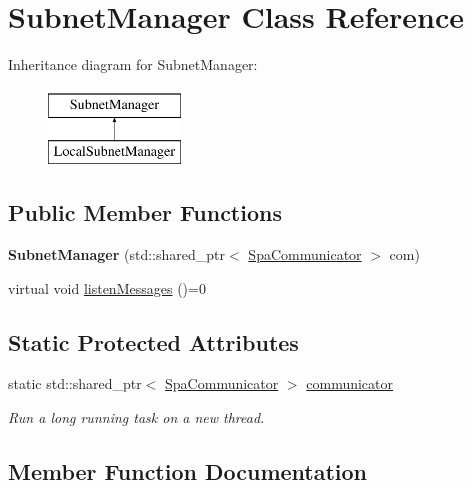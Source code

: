 \hypertarget{classSubnetManager}{}\section{Subnet\+Manager Class Reference}
\label{classSubnetManager}
Inheritance diagram for Subnet\+Manager\+:\begin{figure}[H]
\begin{center}
\leavevmode
\includegraphics[height=2.000000cm]{classSubnetManager}
\end{center}
\end{figure}
\subsection*{Public Member Functions}
\begin{DoxyCompactItemize}
\item 
\mbox{\label{classSubnetManager_af60bbdf2417a03b1e2fb14a5b077597a}} 
{\bfseries Subnet\+Manager} (std\+::shared\+\_\+ptr$<$ \hyperlink{classSpaCommunicator}{Spa\+Communicator} $>$ com)
\item 
virtual void \hyperlink{classSubnetManager_a6aed1acaa5e9f18feb7667904675d119}{listen\+Messages} ()=0
\end{DoxyCompactItemize}
\subsection*{Static Protected Attributes}
\begin{DoxyCompactItemize}
\item 
static std\+::shared\+\_\+ptr$<$ \hyperlink{classSpaCommunicator}{Spa\+Communicator} $>$ \hyperlink{classSubnetManager_acb58a845a46fa4943cb2b9d4a56c9b0f}{communicator}
\begin{DoxyCompactList}\small\item\em Run a long running task on a new thread. \end{DoxyCompactList}\end{DoxyCompactItemize}


\subsection{Member Function Documentation}
\mbox{\label{classSubnetManager_a6aed1acaa5e9f18feb7667904675d119}} 

